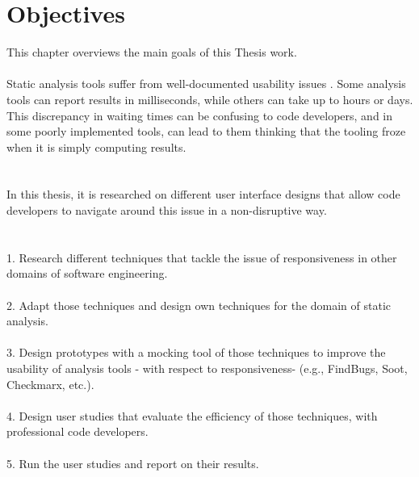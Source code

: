 \chapter{Objectives}
\label{ch:objectives}

This chapter overviews the main goals of this Thesis work. \\ \\

Static analysis tools suffer from well-documented usability issues \cite{CB16,JSMB13}. Some analysis tools can report results in milliseconds, while others can take up to hours or
days. This discrepancy in waiting times can be confusing to code developers, and in some poorly implemented
tools, can lead to them thinking that the tooling froze when it is simply computing results. \\ \\ \\
In this thesis, it is researched on different user interface designs that allow code developers to navigate around
this issue in a non-disruptive way. \\ \\ \\
1. Research different techniques that tackle the issue of responsiveness in other domains of software
engineering. \\ \\
2. Adapt those techniques and design own techniques for the domain of static analysis. \\ \\
3. Design prototypes with a mocking tool \cite{B} of those techniques to improve the usability of analysis tools -
with respect to responsiveness- (e.g., FindBugs, Soot, Checkmarx, etc.). \\ \\
4. Design user studies that evaluate the efficiency of those techniques, with professional code developers. \\ \\
5. Run the user studies and report on their results.

\let\cleardoublepage\clearpage